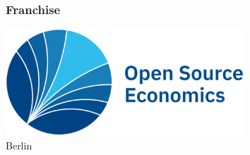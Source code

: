 \begin{frame}[standout]\frametitle{Franchise}\vspace{1cm}

\hspace{3cm}\includegraphics[height=4cm]{material/crop-ose-logo.pdf}\\[-1cm]
\hspace{7.45cm}\textcolor{OSEBlue}{\fontsize{23pt}{20pt}\selectfont Berlin}

\end{frame}

\backupend

%
%
%
%
%
